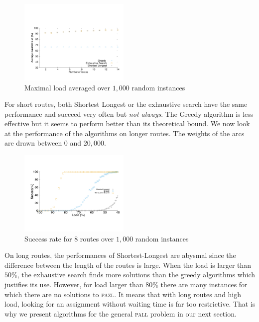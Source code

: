 \documentclass[10pt, conference, letterpaper]{IEEEtran}
\newcommand\pazl{\textsc{pazl}\xspace}
\newcommand\pall{\textsc{pall}\xspace}
\begin{document}
        
      \begin{figure}[h]
      \begin{center}
	 \includegraphics[width=0.47\textwidth]{periode_petite.pdf}
      \end{center}
      \caption{Maximal load averaged over $1,000$ random instances}\label{fig:short}
      \end{figure}
      
      
      For short routes, both  Shortest Longest or the exhaustive search have the same performance and succeed very often but \emph{not always}. The Greedy algorithm is less effective but it seems to perform better than its theoretical bound.
      We now look at the performance of the algorithms on longer routes. The weights of the arcs are drawn between $0$ and $20,000$.

   
\begin{figure}[h]

       \begin{center}
      \includegraphics[width=0.47\textwidth]{echec_longues.pdf}
      \end{center}
       
      \caption{Success rate for $8$ routes over $1,000$ random instances}\label{fig:long}
     \end{figure}
     
     On long routes, the performances of Shortest-Longest are abysmal since the difference between the length of the routes is large.
       When the load is larger than $50\%$, the exhaustive search finds more solutions than the greedy algorithms which justifies its use. However, for load larger than $80\%$ there are many instances for which there are no solutions to \pazl.
        It means that with long routes and high load, looking for an assignment without waiting time is far too restrictive. That is why we present algorithms for the general \pall problem in our next section. 
     
\end{document}
